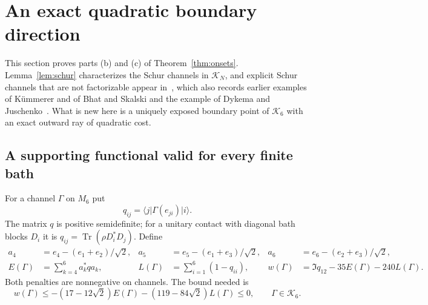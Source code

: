 \documentclass[11pt]{article}
\theoremstyle{definition}
\theoremstyle{remark}
\DeclareMathOperator{\Tr}{Tr}
\newcommand{\K}{\mathcal K}
\newcommand{\ket}[1]{\lvert#1\rangle}
\newcommand{\bra}[1]{\langle#1\rvert}
\begin{document}
\section{An exact quadratic boundary direction}\label{sec:soft}

This section proves parts (b) and (c) of Theorem~\ref{thm:onsets}. Lemma~\ref{lem:schur} characterizes the Schur channels in $\K_N$, and explicit Schur channels that are not factorizable appear in~\cite[Section~3]{HM2011}, which also records earlier examples of K\"ummerer and of Bhat and Skalski and the example of Dykema and Juschenko~\cite[Remarks~3.6 and~4.8]{HM2011}. What is new here is a uniquely exposed boundary point of $\K_6$ with an exact outward ray of quadratic cost.

\subsection{A supporting functional valid for every finite bath}

For a channel $\Gamma$ on $M_6$ put
\[
 q_{ij}=\bra j\Gamma(e_{ji})\ket i.
\]
The matrix $q$ is positive semidefinite; for a unitary contact with diagonal bath blocks $D_i$ it is $q_{ij}=\Tr(\rho D_i^*D_j)$. Define
\begin{align*}
 a_4&=e_4-(e_1+e_2)/\sqrt2,&
 a_5&=e_5-(e_1+e_3)/\sqrt2,&
 a_6&=e_6-(e_2+e_3)/\sqrt2,\\
 E(\Gamma)&=\sum_{k=4}^6a_k^*qa_k,&
 L(\Gamma)&=\sum_{i=1}^6(1-q_{ii}),&
 w(\Gamma)&=\Im q_{12}-35E(\Gamma)-240L(\Gamma).
\end{align*}
Both penalties are nonnegative on channels. The bound needed is
\begin{equation}\label{eq:soft-support}
 w(\Gamma)\le-(17-12\sqrt2)E(\Gamma)
 -(119-84\sqrt2)L(\Gamma)\le0,\qquad\Gamma\in\K_6.
\end{equation}
\end{document}
